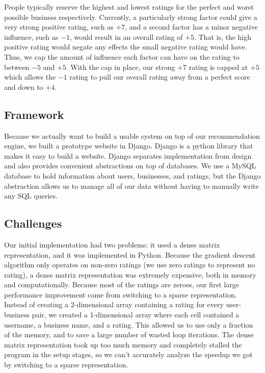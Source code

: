 People typically reserve the highest and lowest ratings for the perfect and
worst possible business respectively. Currently, a particularly strong factor
could give a very strong positive rating, such as $+7$, and a second factor has
a minor negative influence, such as $-1$, would result in an overall rating of
$+5$. That is, the high positive rating would negate any effects the small
negative rating would have. Thus, we cap the amount of influence each factor
can have on the rating to between $-5$ and $+5$. With the cap in place, our
strong $+7$ rating is capped at $+5$ which allows the $-1$ rating to pull our
overall rating away from a perfect score and down to $+4$. \cite{black website}

\subsection{Framework}

Because we actually want to build a usable system on top of our recommendation
engine, we built a prototype website in Django. Django is a python library that
makes it easy to build a website. Django separates implementation from design
and also provides convenient abstractions on top of databases. We use a MySQL
database to hold information about users, businesses, and ratings, but the
Django abstraction allows us to manage all of our data without having to
manually write any SQL queries.

\subsection{Challenges}

Our initial implementation had two problems: it used a dense matrix
representation, and it was implemented in Python. Because the gradient descent
algorithm only operates on non-zero ratings (we use zero ratings to represent
no rating), a dense matrix representation was extremely expensive, both in
memory and computationally. Because most of the ratings are zeroes, our first
large performance improvement came from switching to a sparse representation.
Instead of creating a 2-dimensional array containing a rating for every
user-business pair, we created a 1-dimensional array where each cell contained a
username, a business name, and a rating. This allowed us to use only a fraction
of the memory, and to save a large number of wasted loop iterations. The dense
matrix representation took up too much memory and completely stalled the program
in the setup stages, so we can't accurately analyze the speedup we got by
switching to a sparse representation.

